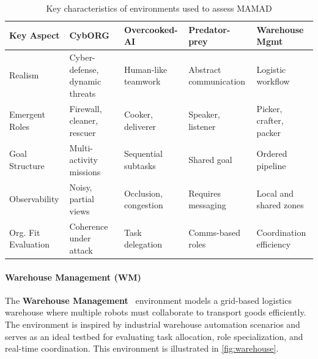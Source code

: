 \documentclass[pdflatex,sn-mathphys-num]{sn-jnl}%
\theoremstyle{thmstyleone}%
\theoremstyle{thmstyletwo}%
\theoremstyle{thmstylethree}%
\begin{document}
\begin{table}[h!]
    \centering
    \begin{footnotesize}
        \renewcommand{\arraystretch}{1.3}
        \begin{tabular}{p{2cm}p{2.2cm}p{2.2cm}p{2.2cm}p{2.2cm}}
            \hline
            \textbf{Key Aspect} & \textbf{CybORG}                & \textbf{Overcooked-AI} & \textbf{Predator-prey} & \textbf{Warehouse Mgmt} \\ \hline
            Realism             & Cyber-defense, dynamic threats & Human-like teamwork    & Abstract communication & Logistic workflow       \\ \hline
            Emergent Roles      & Firewall, cleaner, rescuer     & Cooker, deliverer      & Speaker, listener      & Picker, crafter, packer \\ \hline
            Goal Structure      & Multi-activity missions           & Sequential subtasks    & Shared goal            & Ordered pipeline        \\ \hline
            Observability       & Noisy, partial views           & Occlusion, congestion  & Requires messaging     & Local and shared zones  \\ \hline
            Org. Fit Evaluation & Coherence under attack         & Task delegation        & Comms-based roles      & Coordination efficiency \\ \hline
        \end{tabular}
        \caption{Key characteristics of environments used to assess MAMAD}
        \label{tab:mamad_env_characteristics}
    \end{footnotesize}
\end{table}


\paragraph{Warehouse Management (WM)}
The \textbf{Warehouse Management}~\cite{warehouse_management} environment models a grid-based logistics warehouse where multiple robots must collaborate to transport goods efficiently. The environment is inspired by industrial warehouse automation scenarios and serves as an ideal testbed for evaluating task allocation, role specialization, and real-time coordination. This environment is illustrated in \autoref{fig:warehouse}.
\end{document}
